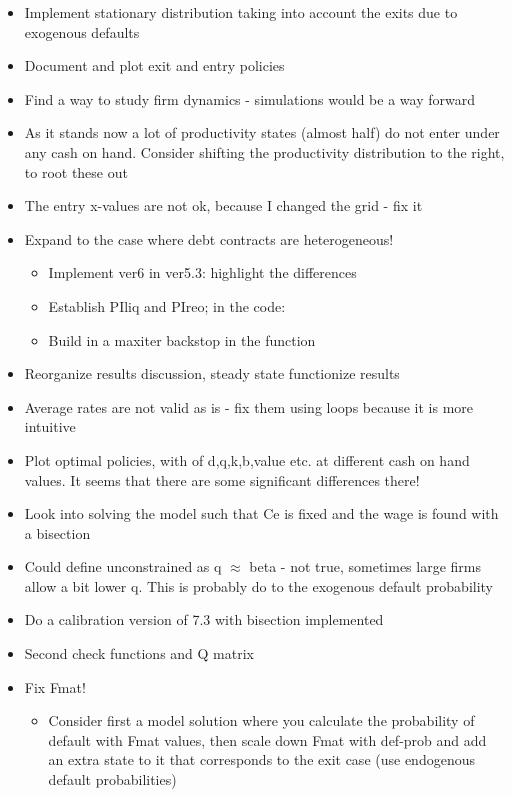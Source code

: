 \documentclass[12pt]{article}
\begin{document}
\begin{itemize}
    \item Implement stationary distribution taking into account the exits due to exogenous defaults \checkmark
    \item Document and plot exit and entry policies \checkmark
    \item Find a way to study firm dynamics - simulations would be a way forward \checkmark
    \item As it stands now a lot of productivity states (almost half) do not enter under any cash on hand. Consider shifting the productivity distribution to the right, to root these out
    \item The entry x-values are not ok, because I changed the grid - fix it \checkmark
    \item Expand to the case where debt contracts are heterogeneous! \checkmark
    \begin{itemize}
        \item Implement ver6 in ver5.3: highlight the differences  \checkmark
        \item Establish PIliq and PIreo; in the code: \checkmark 
        \item Build in a maxiter backstop in the function \checkmark
    \end{itemize}
    \item Reorganize results discussion, steady state functionize results  \checkmark
    \item Average rates are not valid as is - fix them using loops because it is more intuitive  \checkmark
    \item Plot optimal policies, with of d,q,k,b,value etc. at different cash on hand values. It seems that there are some significant differences there! \checkmark
    \item Look into solving the model such that Ce is fixed and the wage is found with a bisection \checkmark
    \item Could define unconstrained as q $\approx$ beta - not true, sometimes large firms allow a bit lower q. This is probably do to the exogenous default probability \checkmark
    \item Do a calibration version of 7.3 with bisection implemented \checkmark
    \item Second check functions and Q matrix  \checkmark
    \item Fix Fmat! \checkmark    
        \begin{itemize}
        \item Consider first a model solution where you calculate the probability of default with Fmat values, then scale down Fmat with def-prob and add an extra state to it that corresponds to the exit case (use endogenous default probabilities)  \checkmark

\end{itemize}
\end{itemize}
\end{document}
